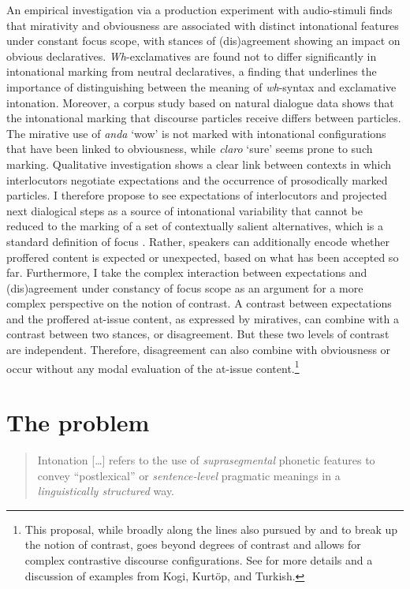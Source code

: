 An empirical investigation via a production experiment with audio-stimuli finds that mirativity and obviousness are associated with distinct intonational features under constant focus scope, with stances of (dis)agreement showing an impact on obvious declaratives. \textit{Wh}-exclamatives are found not to differ significantly in intonational marking from neutral declaratives, a finding that underlines the importance of distinguishing between the meaning of \textit{wh}-syntax and exclamative intonation. Moreover, a corpus study based on natural dialogue data shows that the intonational marking that discourse particles receive differs between particles. The mirative use of \textit{anda} `wow' is not marked with intonational configurations that have been linked to obviousness, while \textit{claro} `sure' seems prone to such marking. Qualitative investigation shows a clear link between contexts in which interlocutors negotiate expectations and the occurrence of prosodically marked particles. I therefore propose to see expectations of interlocutors and projected next dialogical steps as a source of intonational variability that cannot be reduced to the marking of a set of contextually salient alternatives, which is a standard definition of focus \citep{Rooth1992,KrifkaMusan.2012}. Rather, speakers can additionally encode whether proffered content is expected or unexpected, based on what has been accepted so far. Furthermore, I take the complex interaction between expectations and (dis)agreement under constancy of focus scope as an argument for a more complex perspective on the notion of contrast. A contrast between expectations and the proffered at-issue content, as expressed by miratives, can combine with a contrast between two stances, or disagreement. But these two levels of contrast are independent. Therefore, disagreement can also combine with obviousness or occur without any modal evaluation of the at-issue content.\footnote{This proposal, while broadly along the lines also pursued by \citet[]{Repp.2016} and \citet[]{Cruschina.2021} to break up the notion of contrast, goes beyond degrees of contrast and allows for complex contrastive discourse configurations. See \citet[]{Fliessbach.inprep.TILSM} for more details and a discussion of examples from Kogi, Kurtöp, and Turkish.}

\section{The problem}
\label{sec:1.3}

\begin{quote}\sloppy
Intonation [\ldots] refers to the use of \textit{suprasegmental} phonetic features to convey “postlexical” or \textit{sentence-level} pragmatic meanings in a \textit{linguistically structured} way. \citep[4]{Ladd2008}
\end{quote}

